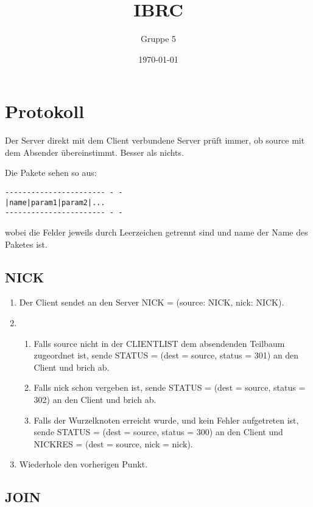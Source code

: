 \documentclass{article}
\title{IBRC}
\author{Gruppe 5}
\date{\today}
\begin{document}
\maketitle

\section{Protokoll}

Der Server direkt mit dem Client verbundene Server prüft immer, ob source mit dem Absender übereinstimmt. Besser als nichts. 

Die Pakete sehen so aus:
\begin{lstlisting}
----------------------- - -
|name|param1|param2|...
----------------------- - -
\end{lstlisting}
wobei die Felder jeweils durch Leerzeichen getrennt sind und name der Name des Paketes ist.

\subsection{NICK}

\begin{enumerate}
  \item Der Client sendet an den Server NICK = (source: NICK, nick: NICK).
  \item
    \begin{enumerate}
      \item Falls source nicht in der CLIENTLIST dem absendenden Teilbaum zugeordnet ist, sende STATUS = (dest = source, status = 301) an den Client und brich ab.
      \item Falls nick schon vergeben ist, sende STATUS = (dest = source, status = 302) an den Client und brich ab.
      \item Falls der Wurzelknoten erreicht wurde, und kein Fehler aufgetreten ist, sende STATUS = (dest = source, status = 300) an den Client und NICKRES = (dest = source, nick = nick).
    \end{enumerate}
  \item Wiederhole den vorherigen Punkt. 
\end{enumerate}

\subsection{JOIN}
\end{document}
